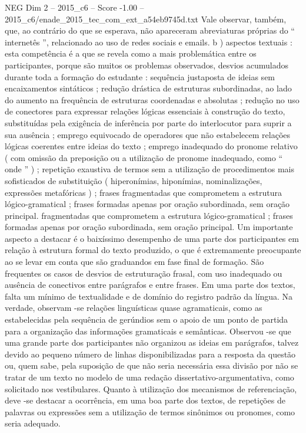 \begin{textsample}{NEG Dim 2 – 2015\_c6 – Score -1.00 – 2015\_c6/enade\_2015\_tec\_com\_ext\_a54eb9745d.txt}
Vale observar, também, que, ao contrário do que se esperava, não apareceram abreviaturas próprias do “ internetês ”, relacionado ao uso de redes sociais e emails. b ) aspectos textuais : esta competência é a que se revela como a mais problemática entre os participantes, porque são muitos os problemas observados, desvios acumulados durante toda a formação do estudante : sequência justaposta de ideias sem encaixamentos sintáticos ; redução drástica de estruturas subordinadas, ao lado do aumento na frequência de estruturas coordenadas e absolutas ; redução no uso de conectores para expressar relações lógicas essenciais à construção do texto, substituídas pela exigência de inferência por parte do interlocutor para suprir a sua ausência ; emprego equivocado de operadores que não estabelecem relações lógicas coerentes entre ideias do texto ; emprego inadequado do pronome relativo ( com omissão da preposição ou a utilização de pronome inadequado, como “ onde ” ) ; repetição exaustiva de termos sem a utilização de procedimentos mais sofisticados de substituição ( hiperonímias, hiponímias, nominalizações, expressões metafóricas ) ; frases fragmentadas que comprometem a estrutura lógico-gramatical ; frases formadas apenas por oração subordinada, sem oração principal. fragmentadas que comprometem a estrutura lógico-gramatical ; frases formadas apenas por oração subordinada, sem oração principal.
Um importante aspecto a destacar é o baixíssimo desempenho de uma parte dos participantes em relação à estrutura formal do texto produzido, o que é extremamente preocupante ao se levar em conta que são graduandos em fase final de formação.
São frequentes os casos de desvios de estruturação frasal, com uso inadequado ou ausência de conectivos entre parágrafos e entre frases.
Em uma parte dos textos, falta um mínimo de textualidade e de domínio do registro padrão da língua.
Na verdade, observam -se relações linguísticas quase agramaticais, como as estabelecidas pela sequência de gerúndios sem o apoio de um ponto de partida para a organização das informações gramaticais e semânticas.
Observou -se que uma grande parte dos participantes não organizou as ideias em parágrafos, talvez devido ao pequeno número de linhas disponibilizadas para a resposta da questão ou, quem sabe, pela suposição de que não seria necessária essa divisão por não se tratar de um texto no modelo de uma redação dissertativo-argumentativa, como solicitado nos vestibulares.
Quanto à utilização dos mecanismos de referenciação, deve -se destacar a ocorrência, em uma boa parte dos textos, de repetições de palavras ou expressões sem a utilização de termos sinônimos ou pronomes, como seria adequado.

\end{textsample}
